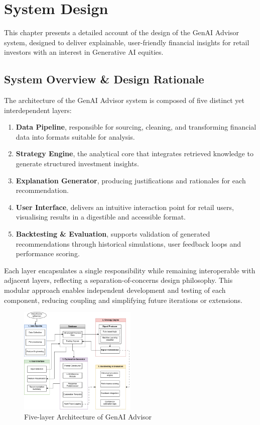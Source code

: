 \section{System Design}

This chapter presents a detailed account of the design of the GenAI Advisor system, designed to deliver explainable, user-friendly financial insights for retail investors with an interest in Generative AI equities.

\subsection{System Overview \& Design Rationale}

The architecture of the GenAI Advisor system is composed of five distinct yet interdependent layers:

\begin{enumerate}
    \item \textbf{Data Pipeline}, responsible for sourcing, cleaning, and transforming financial data into formats suitable for analysis.
    \item \textbf{Strategy Engine}, the analytical core that integrates retrieved knowledge to generate structured investment insights.
    \item \textbf{Explanation Generator}, producing justifications and rationales for each recommendation.
    \item \textbf{User Interface}, delivers an intuitive interaction point for retail users, visualising results in a digestible and accessible format.
    \item \textbf{Backtesting \& Evaluation}, supports validation of generated recommendations through historical simulations, user feedback loops and performance scoring.
\end{enumerate}

Each layer encapsulates a single responsibility while remaining interoperable with adjacent layers, reflecting a separation-of-concerns design philosophy. This modular approach enables independent development and testing of each component, reducing coupling and simplifying future iterations or extensions.

\begin{figure}[ht]
    \centering
    \includegraphics[width=0.5\textwidth]{assets/systemDesign.png}
    \caption{Five-layer Architecture of GenAI Advisor}
    \label{fig:systemDesign}
\end{figure}

